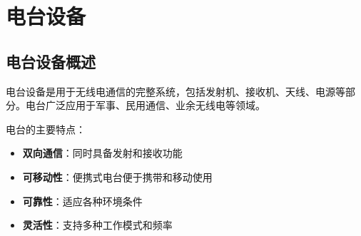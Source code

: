 
\chapter{电台设备}
\label{chap:radio_station}

\section{电台设备概述}
\label{sec:radio_station_intro}

电台设备是用于无线电通信的完整系统，包括发射机、接收机、天线、电源等部分。电台广泛应用于军事、民用通信、业余无线电等领域。

电台的主要特点：
\begin{itemize}
    \item \textbf{双向通信}：同时具备发射和接收功能
    \item \textbf{可移动性}：便携式电台便于携带和移动使用
    \item \textbf{可靠性}：适应各种环境条件
    \item \textbf{灵活性}：支持多种工作模式和频率
\end{itemize}

